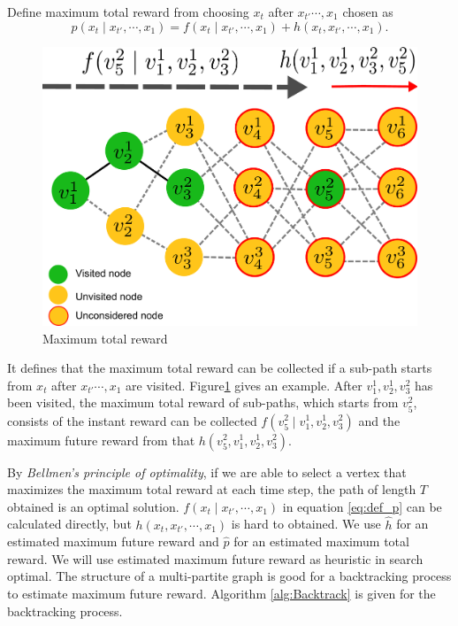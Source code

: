 \documentclass[12pt]{article}
\begin{document}
\begin{mydef}
Define maximum total reward from choosing $ x_{t} $ after $ x_{t'} \cdots , x_{1} $ chosen as 
\begin{equation}
\label{eq:def_p}
p(x_{t} \mid x_{t'} , \cdots , x_{1} ) = f(x_{t} \mid x_{t'} , \cdots , x_{1} ) + h(x_{t} , x_{t'} , \cdots, x_{1} ).
\end{equation}
\end{mydef}

\begin{figure}
\centering
\includegraphics[width=0.5\linewidth]{./DefineFuncP}
\caption{Maximum total reward}
\label{fig:DefineFuncP}
\end{figure}

It defines that the maximum total reward can be collected if a sub-path starts from $ x_{t} $ after $ x_{t'} \cdots , x_{1} $ are visited. Figure\ref{fig:DefineFuncP} gives an example. After $ v^{1}_{1}, v^{1}_{2} , v^{2}_{3} $ has been visited, the maximum total reward of sub-paths, which starts from $ v^{2}_{5} $, consists of the instant reward can be collected $ f( v^{2}_{5} \mid v^{1}_{1}, v^{1}_{2} , v^{2}_{3} ) $ and the maximum future reward from that $ h( v^{2}_{5}, v^{1}_{1}, v^{1}_{2} , v^{2}_{3} ) $.

By \emph{Bellmen's principle of optimality}, if we are able to select a vertex that maximizes the maximum total reward at each time step, the path of length $ T $ obtained is an optimal solution.
$ f(x_{t} \mid x_{t'} , \cdots , x_{1} ) $ in equation \eqref{eq:def_p} can be calculated directly, but $ h(x_{t} , x_{t'} , \cdots, x_{1} ) $ is hard to obtained. 
We use $ \hat{h} $ for an estimated maximum future reward and $ \hat{p} $ for an estimated maximum total reward.
We will use estimated maximum future reward as heuristic in search optimal.
The structure of a multi-partite graph is good for a backtracking process to estimate maximum future reward.
Algorithm \ref{alg:Backtrack} is given for the backtracking process.
\end{document}
